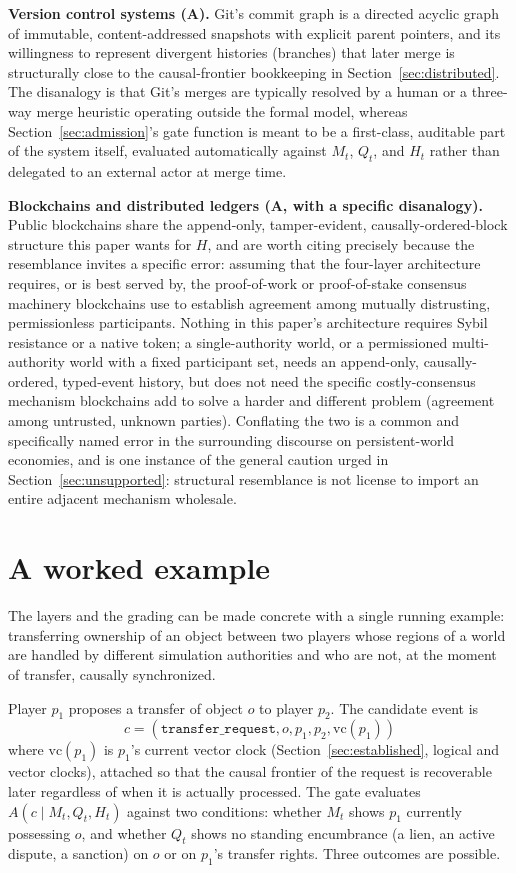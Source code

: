 \documentclass[11pt]{article}
\begin{document}
\textbf{Version control systems (A).} Git's commit graph is a directed acyclic graph of immutable, content-addressed snapshots with explicit parent pointers, and its willingness to represent divergent histories (branches) that later merge is structurally close to the causal-frontier bookkeeping in Section~\ref{sec:distributed}. The disanalogy is that Git's merges are typically resolved by a human or a three-way merge heuristic operating outside the formal model, whereas Section~\ref{sec:admission}'s gate function is meant to be a first-class, auditable part of the system itself, evaluated automatically against $M_t$, $Q_t$, and $H_t$ rather than delegated to an external actor at merge time.

\textbf{Blockchains and distributed ledgers (A, with a specific disanalogy).} Public blockchains share the append-only, tamper-evident, causally-ordered-block structure this paper wants for $H$, and are worth citing precisely because the resemblance invites a specific error: assuming that the four-layer architecture requires, or is best served by, the proof-of-work or proof-of-stake consensus machinery blockchains use to establish agreement among mutually distrusting, permissionless participants. Nothing in this paper's architecture requires Sybil resistance or a native token; a single-authority world, or a permissioned multi-authority world with a fixed participant set, needs an append-only, causally-ordered, typed-event history, but does not need the specific costly-consensus mechanism blockchains add to solve a harder and different problem (agreement among untrusted, unknown parties). Conflating the two is a common and specifically named error in the surrounding discourse on persistent-world economies, and is one instance of the general caution urged in Section~\ref{sec:unsupported}: structural resemblance is not license to import an entire adjacent mechanism wholesale.

\section{A worked example}
\label{sec:worked-example}

The layers and the grading can be made concrete with a single running example: transferring ownership of an object between two players whose regions of a world are handled by different simulation authorities and who are not, at the moment of transfer, causally synchronized.

Player $p_1$ proposes a transfer of object $o$ to player $p_2$. The candidate event is
\[
c = (\texttt{transfer\_request}, o, p_1, p_2, \mathrm{vc}(p_1))
\]
where $\mathrm{vc}(p_1)$ is $p_1$'s current vector clock (Section~\ref{sec:established}, logical and vector clocks), attached so that the causal frontier of the request is recoverable later regardless of when it is actually processed. The gate evaluates $A(c \mid M_t, Q_t, H_t)$ against two conditions: whether $M_t$ shows $p_1$ currently possessing $o$, and whether $Q_t$ shows no standing encumbrance (a lien, an active dispute, a sanction) on $o$ or on $p_1$'s transfer rights. Three outcomes are possible.
\end{document}

